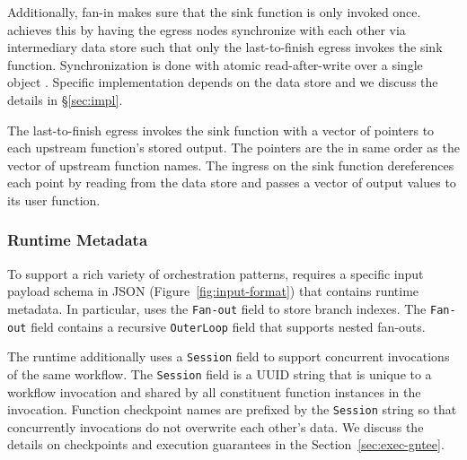 Additionally, fan-in makes sure that the sink function is only invoked once.
\name{} achieves this by having the egress nodes synchronize with each other
via intermediary data store such that only the last-to-finish egress invokes
the sink function. Synchronization is done with atomic read-after-write over a
single object . Specific implementation depends on the data store and we
discuss the details in \S\ref{sec:impl}.

The last-to-finish egress invokes the sink function with a vector of pointers
to each upstream function's stored output. The pointers are the in same order
as the vector of upstream function names. The ingress on the sink function
dereferences each point by reading from the data store and passes a vector of
output values to its user function.


\subsubsection{Runtime Metadata}

To support a rich variety of orchestration patterns, \name{} requires a
specific input payload schema in JSON (Figure~\ref{fig:input-format}) that
contains \name{} runtime metadata. In particular, \name{} uses the
\texttt{Fan-out} field to store branch indexes. The \texttt{Fan-out} field
contains a recursive \texttt{OuterLoop} field that supports nested fan-outs.

The runtime additionally uses a \texttt{Session} field to support concurrent
invocations of the same workflow. The \texttt{Session} field is a UUID string
that is unique to a workflow invocation and shared by all constituent function
instances in the invocation. Function checkpoint names are prefixed by the \texttt{Session} string so that
concurrently invocations do not overwrite each other's data. We discuss the details on
\name{} checkpoints and execution guarantees in the Section~\ref{sec:exec-gntee}.